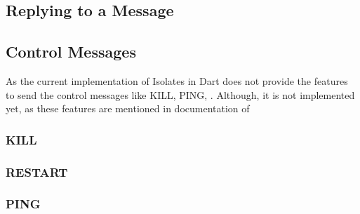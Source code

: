 \subsection{Replying to a Message}

\subsection{Control Messages}
As the current implementation of Isolates in Dart does not provide the features to send the control messages like KILL, PING, . Although, it is not implemented yet, as these features are mentioned in documentation of
\subsubsection{KILL}
\subsubsection{RESTART}
\subsubsection{PING}

